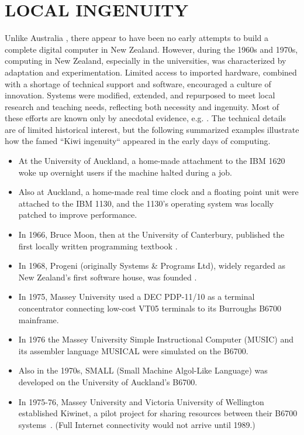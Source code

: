 \documentclass{IEEEcsmag}
\begin{document}
\section{LOCAL INGENUITY}
Unlike Australia \cite{Philipson-2017}, there appear to have been no early attempts to build a complete digital computer in New Zealand. However, during the 1960s and 1970s, computing in New Zealand, especially in the universities, was characterized by adaptation and experimentation. Limited access to imported hardware, combined with a shortage of technical support and software, encouraged a culture of innovation. Systems were modified, extended, and repurposed to meet local research and teaching needs, reflecting both necessity and ingenuity. Most of these efforts are known only by anecdotal evidence, e.g. \cite{Brownlee-private, Thomas-private}. The technical details are of limited historical interest, but the following summarized examples illustrate how the famed “Kiwi ingenuity“ \cite{ingenuity}
appeared in the early days of computing.

\begin{itemize}
\item At the University of Auckland, a home-made attachment to the IBM 1620 woke up overnight users if the machine halted during a job.
\item Also at Auckland, a home-made real time clock and a floating point unit were attached to the IBM 1130, and
the 1130’s operating system was locally patched to improve performance.
\item In 1966, Bruce Moon, then at the University of Canterbury, published the first locally written programming textbook \cite{MoonProgramming}.
\item In 1968, Progeni (originally Systems \& Programs Ltd), widely regarded as New Zealand’s first software house, was founded \cite{Harpham2010}.
\item In 1975, Massey University  used a DEC PDP-11/10 as a terminal concentrator connecting low-cost VT05 terminals to its Burroughs B6700 mainframe.
\item In 1976 the Massey University Simple Instructional Computer (MUSIC) and its assembler language MUSICAL \cite{MUSIC} were simulated on the B6700.
\item Also in the 1970s, SMALL (Small Machine Algol-Like Language) was developed on the University of Auckland’s B6700. 
\item In 1975-76,  Massey University and Victoria University of Wellington established Kiwinet, a pilot project for sharing resources between their B6700 systems~\cite{ConnectingClouds}. (Full Internet connectivity would not arrive until 1989.)
\end{itemize}
\end{document}
